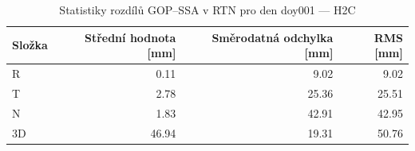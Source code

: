 \begin{table}[H]
\centering
\caption{Statistiky rozdílů GOP–SSA v RTN pro den doy001 — H2C}
\label{tab:hc_ZAZG_doy001_day_stats}
\begin{tabular}{lrrr}
\toprule
Složka & Střední hodnota [mm] & Směrodatná odchylka [mm] & RMS [mm] \\
\midrule
R & 0.11 & 9.02 & 9.02 \\
T & 2.78 & 25.36 & 25.51 \\
N & 1.83 & 42.91 & 42.95 \\
3D & 46.94 & 19.31 & 50.76 \\
\bottomrule
\end{tabular}
\end{table}

